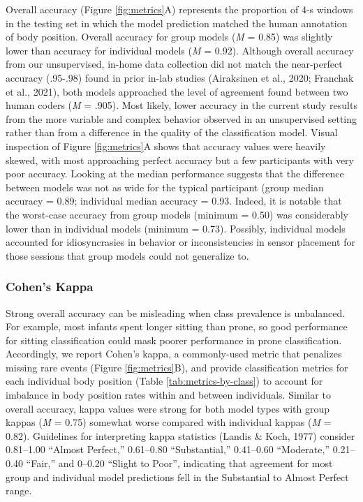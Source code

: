 \documentclass[
  man]{apa6}
\begin{document}
Overall accuracy (Figure \ref{fig:metrics}A) represents the proportion of 4-s windows in the testing set in which the model prediction matched the human annotation of body position. Overall accuracy for group models (\emph{M} = 0.85) was slightly lower than accuracy for individual models (\emph{M} = 0.92). Although overall accuracy from our unsupervised, in-home data collection did not match the near-perfect accuracy (.95-.98) found in prior in-lab studies (Airaksinen et al., 2020; Franchak et al., 2021), both models approached the level of agreement found between two human coders (\emph{M} = .905). Most likely, lower accuracy in the current study results from the more variable and complex behavior observed in an unsupervised setting rather than from a difference in the quality of the classification model. Visual inspection of Figure \ref{fig:metrics}A shows that accuracy values were heavily skewed, with most approaching perfect accuracy but a few participants with very poor accuracy. Looking at the median performance suggests that the difference between models was not as wide for the typical participant (group median accuracy = 0.89; individual median accuracy = 0.93. Indeed, it is notable that the worst-case accuracy from group models (minimum = 0.50) was considerably lower than in individual models (minimum = 0.73). Possibly, individual models accounted for idiosyncrasies in behavior or inconsistencies in sensor placement for those sessions that group models could not generalize to.

\hypertarget{cohens-kappa}{%
\subsubsection{Cohen's Kappa}\label{cohens-kappa}}

Strong overall accuracy can be misleading when class prevalence is unbalanced. For example, most infants spent longer sitting than prone, so good performance for sitting classification could mask poorer performance in prone classification. Accordingly, we report Cohen's kappa, a commonly-used metric that penalizes missing rare events (Figure \ref{fig:metrics}B), and provide classification metrics for each individual body position (Table \ref{tab:metrics-by-class}) to account for imbalance in body position rates within and between individuals. Similar to overall accuracy, kappa values were strong for both model types with group kappas (\emph{M} = 0.75) somewhat worse compared with individual kappas (\emph{M} = 0.82). Guidelines for interpreting kappa statistics (Landis \& Koch, 1977) consider 0.81--1.00 ``Almost Perfect,'' 0.61--0.80 ``Substantial,'' 0.41--0.60 ``Moderate,'' 0.21-- 0.40 ``Fair,'' and 0--0.20 ``Slight to Poor'', indicating that agreement for most group and individual model predictions fell in the Substantial to Almost Perfect range.
\end{document}
